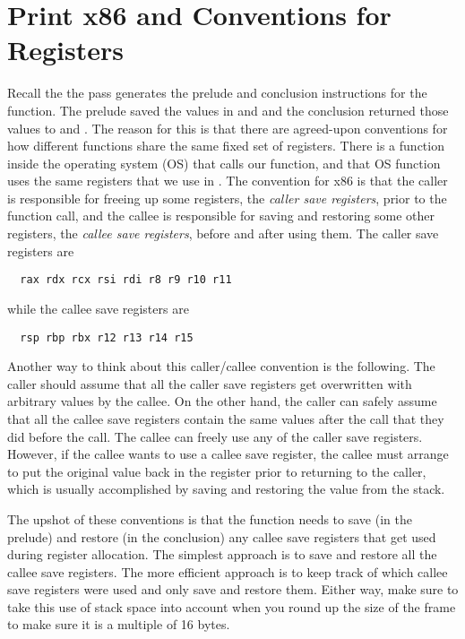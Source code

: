 \documentclass[11pt]{book}
\begin{document}
\section{Print x86 and Conventions for Registers}
\label{sec:print-x86-reg-alloc}

Recall the the  pass generates the prelude and
conclusion instructions for the  function.  The prelude
saved the values in  and  and the conclusion
returned those values to  and . The reason for
this is that there are agreed-upon conventions for how different
functions share the same fixed set of registers. There is a function
inside the operating system (OS) that calls our  function,
and that OS function uses the same registers that we use in
. The convention for x86 is that the caller is responsible
for freeing up some registers, the \emph{caller save registers}, prior
to the function call, and the callee is responsible for saving and
restoring some other registers, the \emph{callee save registers},
before and after using them. The caller save registers are
\begin{lstlisting}
  rax rdx rcx rsi rdi r8 r9 r10 r11
\end{lstlisting}
while the callee save registers are
\begin{lstlisting}
  rsp rbp rbx r12 r13 r14 r15
\end{lstlisting}
Another way to think about this caller/callee convention is the
following. The caller should assume that all the caller save registers
get overwritten with arbitrary values by the callee.  On the other
hand, the caller can safely assume that all the callee save registers
contain the same values after the call that they did before the call.
The callee can freely use any of the caller save registers.  However,
if the callee wants to use a callee save register, the callee must
arrange to put the original value back in the register prior to
returning to the caller, which is usually accomplished by saving and
restoring the value from the stack.

The upshot of these conventions is that the  function needs
to save (in the prelude) and restore (in the conclusion) any callee
save registers that get used during register allocation. The simplest
approach is to save and restore all the callee save registers. The
more efficient approach is to keep track of which callee save
registers were used and only save and restore them. Either way, make
sure to take this use of stack space into account when you round up
the size of the frame to make sure it is a multiple of 16 bytes.
\end{document}
